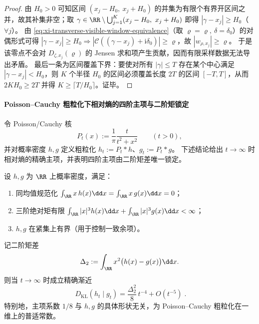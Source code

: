 \begin{proof}
由 \(H_0>0\) 可知区间 \((x_j-H_0,\ x_j+H_0)\) 的并集为有限个有界开区间之并，故其补集非空；取
\(
\gamma\in\RR\setminus\bigcup_{j=1}^{K}(x_j-H_0,\ x_j+H_0)
\)
即得 \(|\gamma-x_j|\ge H_0\)（\(\forall j\)）。
由 \eqref{eq:xi-transverse-visible-window-equivalence}（取 \(\varrho=\varrho,\ \delta=\delta_0\)）的对偶形式可得
\(
|\gamma-x_j|\ge H_0\Rightarrow |\mathcal{C}((\gamma-x_j)+\mathrm{i}\delta_0)|\ge\varrho
\)，故 \(|w_{\rho,x_j}|\ge\varrho\)。
于是该零点不会对 \(D_{\zeta,x_j}(\varrho)\) 的 Jensen 求和项产生贡献，因而有限采样数据无法导出矛盾。
最后一条为区间覆盖下界：要使对所有 \(|\gamma|\le T\) 存在某个中心满足 \(|\gamma-x_j|<H_0\)，则 \(K\) 个半径 \(H_0\) 的区间必须覆盖长度 \(2T\) 的区间 \([-T,T]\)，从而 \(2KH_0\ge 2T\) 并得 \(K\ge\lceil T/H_0\rceil\)。证毕。
\end{proof}

\paragraph{Poisson--Cauchy 粗粒化下相对熵的四阶主项与二阶矩锁定}\label{par:xi-poisson-cauchy-kl-fourth-order}
令 Poisson/Cauchy 核
\[
P_t(x):=\frac{1}{\pi}\frac{t}{t^2+x^2}\qquad(t>0),
\]
并对概率密度 \(h,g\) 定义粗粒化 \(h_t:=P_t*h\)、\(g_t:=P_t*g\)。
下述结论给出 \(t\to\infty\) 时相对熵的精确主项，并表明四阶主项由二阶矩差唯一锁定。

\begin{theorem}\label{thm:xi-poisson-cauchy-kl-fourth-order-universality}
设 \(h,g\) 为 \(\RR\) 上概率密度，满足：
\begin{enumerate}
  \item 同均值规范化 \(\int_{\RR}x\,h(x)\dd x=\int_{\RR}x\,g(x)\dd x=0\)；
  \item 三阶绝对矩有限 \(\int_{\RR}|x|^3h(x)\dd x+\int_{\RR}|x|^3g(x)\dd x<\infty\)；
  \item \(h,g\) 在紧集上有界（用于控制一致余项）。
\end{enumerate}
记二阶矩差
\[
\Delta_2:=\int_{\RR}x^2\bigl(h(x)-g(x)\bigr)\dd x.
\]
则当 \(t\to\infty\) 时成立精确渐近
\begin{equation}\label{eq:xi-poisson-cauchy-kl-fourth-order}
\boxed{\;
D_{\mathrm{KL}}(h_t\mid g_t)
=\frac{\Delta_2^2}{8}\,t^{-4}+O(t^{-5})\; }.
\end{equation}
特别地，主项系数 \(1/8\) 与 \(h,g\) 的具体形状无关，为 Poisson--Cauchy 粗粒化在一维上的普适常数。
\end{theorem}


